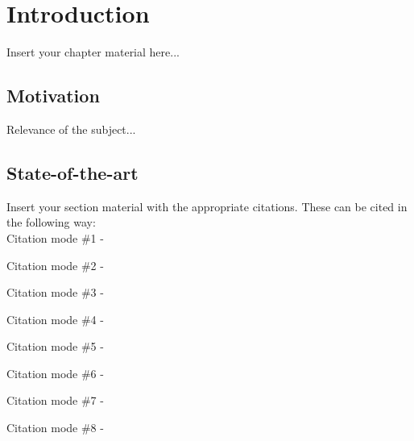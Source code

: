 
\chapter{Introduction}
\label{chapter:introduction}

Insert your chapter material here...

\section{Motivation}
\label{section:motivation}

Relevance of the subject...


\section{State-of-the-art}
\label{section:state}

Insert your section material with the appropriate citations.
These can be cited in the following way: \\

Citation mode \#1 - \quad \cite{jameson:adjointns}

Citation mode \#2 - \quad \citet{jameson:adjointns}

Citation mode \#3 - \quad \citep{jameson:adjointns}


Citation mode \#4 - \quad \citet*{jameson:adjointns}

Citation mode \#5 - \quad \citep*{jameson:adjointns}


Citation mode \#6 - \quad \citealt{jameson:adjointns}

Citation mode \#7 - \quad \citealp{jameson:adjointns}


Citation mode \#8 - \quad \citeauthor{jameson:adjointns}

